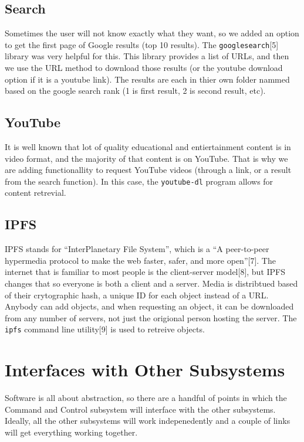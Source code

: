 \documentclass{article}
\begin{document}
\subsection{Search}

Sometimes the user will not know exactly what they want, so we added
an option to get the first page of Google results (top 10
results). The \texttt{googlesearch}[5] library was very helpful for
this. This library provides a list of URLs, and then we use the URL
method to download those results (or the youtube download option if it
is a youtube link). The results are each in thier own folder nammed
based on the google search rank (1 is first result, 2 is second
result, etc). 

\subsection{YouTube}

It is well known that lot of quality educational and entiertainment
content is in video format, and the majority of that content is on
YouTube. That is why we are adding functionallity to request YouTube
videos (through a link, or a result from the search function). In this
case, the \texttt{youtube-dl} program allows for content retrevial.

\subsection{IPFS}
IPFS stands for ``InterPlanetary File System'', which is a ``A
peer-to-peer hypermedia protocol to make the web faster, safer, and
more open''[7]. The internet that is familiar to most people is the
client-server model[8], but IPFS changes that so everyone is both a
client and a server. Media is distribtued based of their crytographic
hash, a unique ID for each object instead of a URL. Anybody can add
objects, and when requesting an object, it can be downloaded from any
number of servers, not just the origional person hosting the
server. The \texttt{ipfs} command line utility[9] is used to retreive
objects.

\section{Interfaces with Other Subsystems}

Software is all about abstraction, so there are a handful of points in
which the Command and Control subsystem will interface with the other
subsystems. Ideally, all the other subsystems will work indepenedently
and a couple of links will get everything working together.
\end{document}
